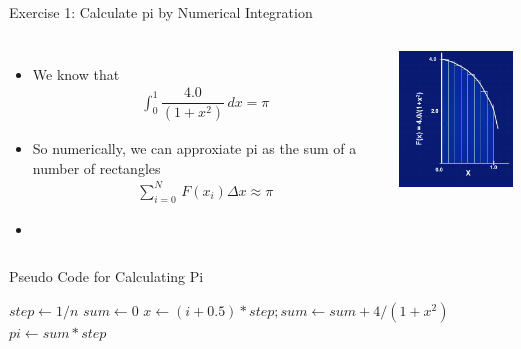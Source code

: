 \documentclass[10pt,t]{beamer}
\begin{document}
\setcounter{algorithm}{0}
\begin{frame}[allowframebreaks]{Exercise 1: Calculate pi by Numerical Integration}
  \begin{columns}
    \column{5cm}
    \begin{itemize}
      \item We know that
      \begin{align*}
        \int^1_0 \dfrac{4.0}{(1+x^2)}\, dx = \pi
      \end{align*}
      \item So numerically, we can approxiate pi as the sum of a number of rectangles
      \begin{align*}
        \sum^N_{i=0}\,F(x_i)\Delta x \approx \pi
      \end{align*}
      \item[] 
    \end{itemize}
    \column{5cm}
    \begin{center}
      \includegraphics[width=4cm]{./pi}
    \end{center}
  \end{columns}

  \begin{algorithm}[H]
    \caption{Pseudo Code for Calculating Pi}
    \begin{algorithmic}
        \State $step \gets 1/n$
        \State $sum \gets 0$
        \State $x \gets (i+0.5)*step; sum \gets sum + 4/(1+x^2)$
        \EndDo
        \State $pi \gets sum * step$
        \EndFunction
    \end{algorithmic}
  \end{algorithm}
\end{frame}
\end{document}
